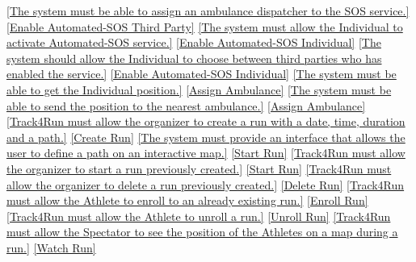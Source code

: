 \documentclass[a4paper]{article}
\begin{document}
\begin{traceabilitymatrix}
                {\ref{The system must be able to assign an ambulance dispatcher to the SOS service.}}
                {\ref{Enable Automated-SOS Third Party}}
                {}
            \con{\ref{The Individual shall be able to activate Automated-SOS service.}}
                {\ref{The system must allow the Individual to activate Automated-SOS service.}}
                {\ref{Enable Automated-SOS Individual}}
                {}
                \con{\ref{The Individual shall be able to activate Automated-SOS service.}}
                {\ref{The system should allow the Individual to choose between third parties who has enabled the service.}}
                {\ref{Enable Automated-SOS Individual}}
                {}
            \con{\ref{The Dispatcher shall be able to assign an ambulance to an incident.}}
                {\ref{The system must be able to get the Individual position.}}
                {\ref{Assign Ambulance}}
                {}
                \con{\ref{The Dispatcher shall be able to assign an ambulance to an incident.}}
                {\ref{The system must be able to send the position to the nearest ambulance.}}
                {\ref{Assign Ambulance}}
                {}
            \con{\ref{The Organizer shall be able to create a run.}}
                {\ref{Track4Run must allow the organizer to create a run with a date, time, duration and a path.}}
                {\ref{Create Run}}
                {}
                \con{\ref{The Organizer should be able to start a run.}}
                {\ref{The system must provide an interface that allows the user to define a path on an interactive map.}}
                {\ref{Start Run}}
                {}
            \con{\ref{The Organizer should be able to start a run.}}
                {\ref{Track4Run must allow the organizer to start a run previously created.}}
                {\ref{Start Run}}
                {}
            \con{\ref{The Organizer should be able to delete a run.}}
                {\ref{Track4Run must allow the organizer to delete a run previously created.}}
                {\ref{Delete Run}}
                {}
            \con{\ref{The Athlete should be able to enroll a run.}}
                {\ref{Track4Run must allow the Athlete to enroll to an already existing run.}}
                {\ref{Enroll Run}}
                {}
            \con{\ref{The Athlete should be able to unroll a run.}}
                {\ref{Track4Run must allow the Athlete to unroll a run.}}
                {\ref{Unroll Run}}
                {}
            \con{\ref{The Spectator should be able to watch a run.}}
                {\ref{Track4Run must allow the Spectator to see the position of the Athletes on a map during a run.}}
                {\ref{Watch Run}}
                {}
        \end{traceabilitymatrix}
        
\end{document}
